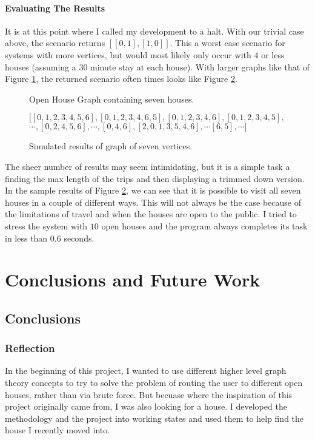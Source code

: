 \documentclass[letterpaper,11pt]{report}
\theoremstyle{definition}
\theoremstyle{definition}
\begin{document}
\subsubsection{Evaluating The Results}
It is at this point where I called my development to a halt. With our trivial case above, the scenario returns $[[0,1], [1,0]]$. This a worst case scenario for systems with more vertices, but would most likely only occur with $4$ or less houses (assuming a $30$ minute stay at each house). With larger graphs like that of Figure \ref{seven-houses}, the returned scenario often times looks like Figure \ref{seven-houses-results}.
\begin{figure}[!htb]
  \begin{center}
    
    \caption{Open House Graph containing seven houses.}\label{seven-houses}
  \end{center}
\end{figure}
\begin{figure}
  \begin{center}
    $[[0, 1, 2, 3, 4, 5, 6], [0, 1, 2, 3, 4, 6, 5], [0, 1, 2, 3, 4, 6], [0, 1, 2, 3, 4, 5],$\\ $\cdots, [0, 2, 4, 5, 6], \cdots, [0, 4, 6], [2, 0, 1, 3, 5, 4, 6], \cdots [6, 5], \cdots]$
  \end{center}
  \caption{Simulated results of graph of seven vertices.}\label{seven-houses-results}
\end{figure}

The sheer number of results may seem intimidating, but it is a simple task a finding the max length of the trips and then displaying a trimmed down version. In the sample results of Figure \ref{seven-houses-results}, we can see that it is possible to visit all seven houses in a couple of different ways. This will not always be the case because of the limitations of travel and when the houses are open to the public. I tried to stress the system with $10$ open houses and the program always completes its task in less than $0.6$ seconds.

\chapter{Conclusions and Future Work}
\section{Conclusions}
\subsection{Reflection}
In the beginning of this project, I wanted to use different higher level graph theory concepts to try to solve the problem of routing the user to different open houses, rather than via brute force. But becuase where the inspiration of this project originally came from, I was also looking for a house. I developed the methodology and the project into working states and used them to help find the house I recently moved into.
\end{document}
